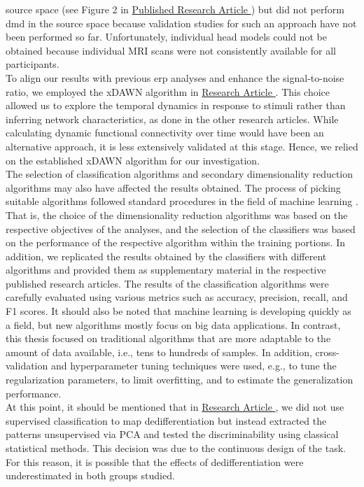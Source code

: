 source space (see Figure 2 in \hyperref[pub:paperIII]{Published Research Article }) but did not perform \gls{dmd} in the source space because validation studies for such an approach have not been performed so far. Unfortunately, individual head models could not be obtained because individual MRI scans were not consistently available for all participants.\\
To align our results with previous \gls{erp} analyses and enhance the signal-to-noise ratio, we employed the xDAWN algorithm in \hyperref[results:paperII]{Research Article }. This choice allowed us to explore the temporal dynamics in response to stimuli rather than inferring network characteristics, as done in the other research articles. While calculating dynamic functional connectivity over time would have been an alternative approach, it is less extensively validated at this stage. Hence, we relied on the established xDAWN algorithm for our investigation.\\
The selection of classification algorithms and secondary dimensionality reduction algorithms may also have affected the results obtained. The process of picking suitable algorithms followed standard procedures in the field of machine learning \cite{Shalev2014}. That is, the choice of the dimensionality reduction algorithms was based on the respective objectives of the analyses, and the selection of the classifiers was based on the performance of the respective algorithm within the training portions. In addition, we replicated the results obtained by the classifiers with different algorithms and provided them as supplementary material in the respective published research articles. The results of the classification algorithms were carefully evaluated using various metrics such as accuracy, precision, recall, and F1 scores. It should also be noted that machine learning is developing quickly as a field, but new algorithms mostly focus on big data applications. In contrast, this thesis focused on traditional algorithms that are more adaptable to the amount of data available, i.e., tens to hundreds of samples. In addition, cross-validation and hyperparameter tuning techniques were used, e.g., to tune the regularization parameters, to limit overfitting, and to estimate the generalization performance.\\
At this point, it should be mentioned that in \hyperref[results:paperIII]{Research Article }, we did not use supervised classification to map dedifferentiation but instead extracted the patterns unsupervised via PCA and tested the discriminability using classical statistical methods. This decision was due to the continuous design of the task. For this reason, it is possible that the effects of dedifferentiation were underestimated in both groups studied.\\
